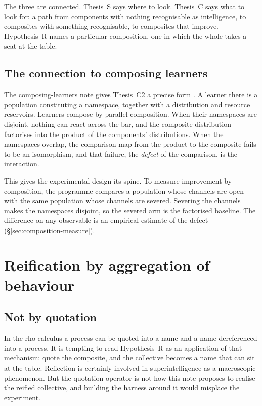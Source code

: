\documentclass[11pt,a4paper]{article}
\begin{document}
The three are connected. Thesis~S says where to look. Thesis~C says what to look for: a path from
components with nothing recognisable as intelligence, to composites with something recognisable,
to composites that improve. Hypothesis~R names a particular composition, one in which the whole
takes a seat at the table.

\subsection{The connection to composing learners}

The composing-learners note gives Thesis~C2 a precise form \cite{rholife-compose}. A learner
there is a population constituting a namespace, together with a distribution and resource
reservoirs. Learners compose by parallel composition. When their namespaces are disjoint, nothing
can react across the bar, and the composite distribution factorises into the product of the
components' distributions. When the namespaces overlap, the comparison map from the product to the
composite fails to be an isomorphism, and that failure, the \emph{defect} of the comparison, is
the interaction.

This gives the experimental design its spine. To measure improvement by composition, the
programme compares a population whose channels are open with the same population whose channels
are severed. Severing the channels makes the namespaces disjoint, so the severed arm is the
factorised baseline. The difference on any observable is an empirical estimate of the defect
(\S\ref{sec:composition-measure}).

\section{Reification by aggregation of behaviour}\label{sec:reify}

\subsection{Not by quotation}

In the rho calculus a process can be quoted into a name and a name dereferenced into a process.
It is tempting to read Hypothesis~R as an application of that mechanism: quote the composite, and
the collective becomes a name that can sit at the table. Reflection is certainly involved in
superintelligence as a macroscopic phenomenon. But the quotation operator is not how this note
proposes to realise the reified collective, and building the harness around it would misplace the
experiment.
\end{document}

